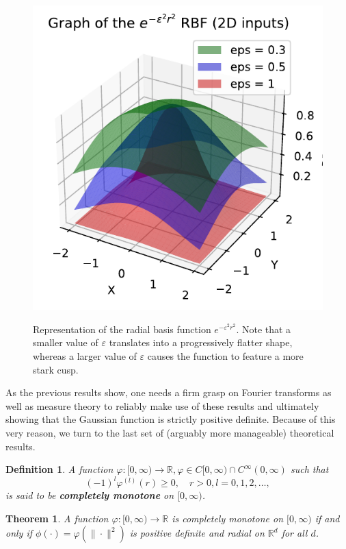 \documentclass[12pt]{report} %
\newtheorem{definition}{Definition}
\newtheorem{theorem}{Theorem}
\newcommand{\tmstrong}[1]{\textbf{#1}}
\begin{document}
  \begin{figure}[ht]
    \centering
    {\includegraphics[width=.5\textwidth, clip=true, trim={0 0 .1cm 0}]{imagenes/rbf_discussion/negative-exp-rbf.pdf}}
    \caption{Representation of the radial basis function $e^{-\varepsilon^2 r^2}$. Note that a smaller value of $\varepsilon$ translates into a progressively flatter shape, whereas a larger value of $\varepsilon$ causes the function to feature a more stark cusp.}
    \label{fig:negative-exp-rbf}
\end{figure}

As the previous results show, one needs a firm grasp on Fourier transforms as well as
measure theory to reliably make use of these results and ultimately showing that
the Gaussian function is strictly positive definite. Because of this very reason, we turn 
to the last set of (arguably more manageable) theoretical results.


\begin{definition}
  A function $\varphi : [0, \infty) \rightarrow \mathbb{R}, \varphi \in C [0,
  \infty) \cap C^{\infty} (0, \infty)$ such that
  \[ (- 1)^{l} \varphi^{(l)} (r) \geq 0, \quad r > 0,
     l= 0, 1, 2, \ldots, \]
  is said to be {\tmstrong{completely monotone}} on $[0, \infty)$.
\end{definition}

\begin{theorem}
  \label{thm-completely-monotone-iff-positive-definite-radial}A function
  $\varphi : [0, \infty) \rightarrow \mathbb{R}$ is completely monotone on
  $[0, \infty)$ if and only if $\phi (\cdot) = \varphi (\| \cdot \|^2)$ is
  positive definite and radial on $\mathbb{R}^d$ for all $d$.
\end{theorem}
\end{document}
